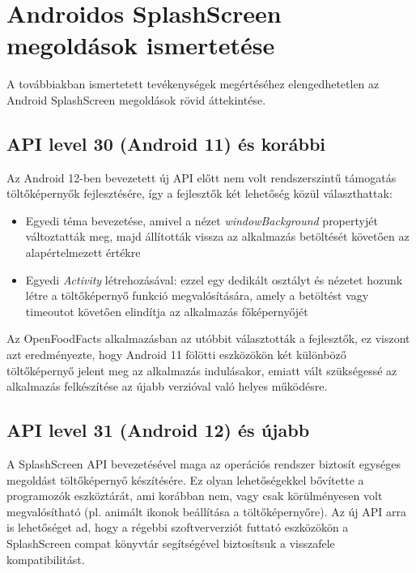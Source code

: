 \chapter{Androidos SplashScreen megoldások ismertetése}

A továbbiakban ismertetett tevékenységek megértéséhez elengedhetetlen
az Android SplashScreen megoldások rövid áttekintése.

\section{API level 30 (Android 11) és korábbi}
Az Android 12-ben bevezetett új API előtt nem volt rendszerszintű támogatás töltőképernyők
fejlesztésére, így a fejlesztők két lehetőség közül választhattak: %
\begin{itemize}
 \item Egyedi téma bevezetése, amivel a nézet \textit{windowBackground} propertyjét változtatták meg,
 majd állították vissza az alkalmazás betöltését követően az alapértelmezett értékre
 \item Egyedi \textit{Activity} létrehozásával: ezzel egy dedikált osztályt és nézetet hozunk létre
 a töltőképernyő funkció megvalósítására, amely a betöltést vagy timeoutot követően elindítja
 az alkalmazás főképernyőjét %
\end{itemize}


Az OpenFoodFacts alkalmazásban az utóbbit választották a fejlesztők, ez viszont azt eredményezte,
hogy Android 11 fölötti eszközökön két különböző töltőképernyő jelent meg az alkalmazás indulásakor,
emiatt vált szükségessé az alkalmazás felkészítése az újabb verzióval való helyes működésre.

\section{API level 31 (Android 12) és újabb}
A SplashScreen API bevezetésével maga az operációs rendszer biztosít egységes megoldást
töltőképernyő készítésére. Ez olyan lehetőségekkel bővítette a programozók eszköztárát, ami korábban
nem, vagy csak körülményesen volt megvalósítható (pl. animált ikonok beállítása
a töltőképernyőre).
Az új API arra is lehetőséget ad, hogy a régebbi szoftververziót futtató eszközökön a SplashScreen
compat könyvtár %
segítségével biztosítsuk a visszafele kompatibilitást.
